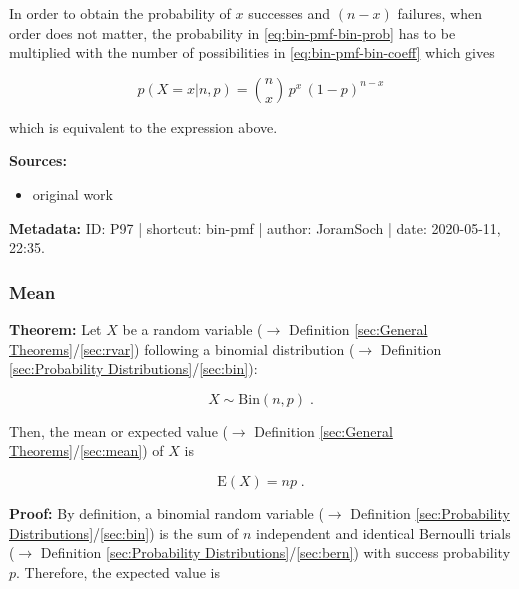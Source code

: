 \documentclass[a4paper,12pt,twoside]{book}
\begin{document}
In order to obtain the probability of $x$ successes and $(n-x)$ failures, when order does not matter, the probability in \eqref{eq:bin-pmf-bin-prob} has to be multiplied with the number of possibilities in \eqref{eq:bin-pmf-bin-coeff} which gives

\begin{equation} \label{eq:bin-pmf-bin-pmf-qed}
p(X=x|n,p) = {n \choose x} \, p^x \, (1-p)^{n-x}
\end{equation}

which is equivalent to the expression above.


\vspace{1em}
\textbf{Sources:}
\begin{itemize}
\item original work\end{itemize}


\vspace{1em}
\textbf{Metadata:} ID: P97 | shortcut: bin-pmf | author: JoramSoch | date: 2020-05-11, 22:35.
\vspace{1em}



\subsubsection[\textbf{Mean}]{Mean} \label{sec:bin-mean}
\setcounter{equation}{0}

\textbf{Theorem:} Let $X$ be a random variable ($\rightarrow$ Definition \ref{sec:General Theorems}/\ref{sec:rvar}) following a binomial distribution ($\rightarrow$ Definition \ref{sec:Probability Distributions}/\ref{sec:bin}):

\begin{equation} \label{eq:bin-mean-bin}
X \sim \mathrm{Bin}(n,p) \; .
\end{equation}

Then, the mean or expected value ($\rightarrow$ Definition \ref{sec:General Theorems}/\ref{sec:mean}) of $X$ is

\begin{equation} \label{eq:bin-mean-bin-mean}
\mathrm{E}(X) = n p \; .
\end{equation}


\vspace{1em}
\textbf{Proof:} By definition, a binomial random variable ($\rightarrow$ Definition \ref{sec:Probability Distributions}/\ref{sec:bin}) is the sum of $n$ independent and identical Bernoulli trials ($\rightarrow$ Definition \ref{sec:Probability Distributions}/\ref{sec:bern}) with success probability $p$. Therefore, the expected value is
\end{document}
